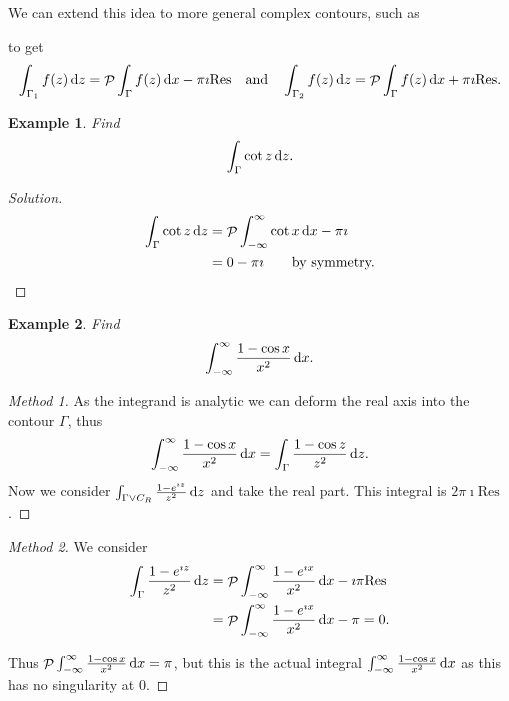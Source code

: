 \documentclass{notes}
\DeclareMathOperator{\Pv}{\mathcal{P}}
\newcommand{\Res}{\mathrm{Res}}
\theoremstyle{plain}
\newtheorem*{example}{Example}
\begin{document}
We can extend this idea to more general complex contours, such as

\vspace{1in}

to get
\[
\int_{\Gamma_1} f(z)\, \ud z = \Pv \int_\Gamma f(z)\, \ud x - \pi \imath \Res
\quad \text{and} \quad
\int_{\Gamma_2} f(z)\, \ud z = \Pv \int_\Gamma f(z)\, \ud x + \pi \imath \Res.
\]

\begin{example}
Find
\[
\int_\Gamma \cot z\, \mathrm{d} z.
\]
\end{example}

\begin{proof}[Solution]
\begin{align*}
\int_\Gamma \cot z\, \ud z &= \Pv \int_{-\infty}^\infty \cot x\, \ud x
- \pi \imath \\
&= 0 - \pi \imath \qquad \text{by symmetry.}
\end{align*}
\end{proof}

\begin{example}
Find
\[
\int_{-\infty}^\infty \frac{1 - \cos x}{x^2}\, \mathrm{d} x.
\]
\end{example}

\vspace{0.5in}

\begin{proof}[Method 1]
As the integrand is analytic we can deform the real axis into the
contour $\Gamma$, thus
\[
\int_{-\infty}^\infty \frac{1 - \cos x}{x^2}\, \mathrm{d} x
= \int_\Gamma  \frac{1 - \cos z}{z^2}\, \mathrm{d} z.
\]
Now we consider $\int_{\Gamma \vee C_R} \frac{1 - e^{\imath z}}{z^2}\, \mathrm{d} z$
and take the real part.  This integral is $2 \pi \imath \Res$.
\end{proof}

\begin{proof}[Method 2]
We consider 
\begin{align*}
\int_\Gamma \frac{1-e^{\imath z}}{z^2}\, \ud z &=
\Pv \int_{-\infty}^\infty \frac{1-e^{\imath x}}{x^2}\, \ud x
- \imath \pi \Res \\
&= \Pv \int_{-\infty}^\infty \frac{1-e^{\imath x}}{x^2}\, \ud x
- \pi = 0.
\end{align*}

Thus $\Pv \int_{-\infty}^\infty \frac{1-\cos x}{x^2}\, \ud x = \pi$,
but this is the actual integral $\int_{-\infty}^\infty
\frac{1-\cos x}{x^2}\, \mathrm{d} x$ as this has no singularity at $0$.
\end{proof}
\end{document}
